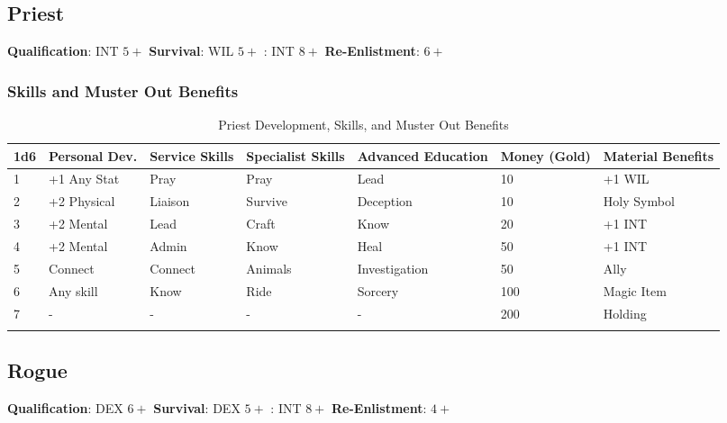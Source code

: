 \documentclass[itdr/core]{subfiles}
\begin{document}
\subsection{Priest}
\textbf{Qualification}: INT $5+$
\textbf{Survival}: WIL $5+$
: INT $8+$
\textbf{Re-Enlistment}: $6+$
\subsubsection{Skills and Muster Out Benefits}
\begin{longtable}{p{} p{} p{} p{} p{} p{} p{}}
\hline
\textbf{1d6} & \textbf{Personal Dev.} & \textbf{Service Skills} & \textbf{Specialist Skills} & \textbf{Advanced Education} & \textbf{Money (Gold)} & \textbf{Material Benefits} \\
\hline
1 & +1 Any Stat & Pray & Pray & Lead & 10 & +1 WIL \\
2 & +2 Physical & Liaison & Survive & Deception & 10 & Holy Symbol \\
3 & +2 Mental & Lead & Craft & Know & 20 & +1 INT \\
4 & +2 Mental & Admin & Know & Heal & 50 & +1 INT \\
5 & Connect & Connect & Animals & Investigation & 50 & Ally \\
6 & Any skill & Know & Ride & Sorcery & 100 & Magic Item \\
7 & - & - & - & - & 200 & Holding \\
\hline
\caption{Priest Development, Skills, and Muster Out Benefits}
\end{longtable}

\subsection{Rogue}
\textbf{Qualification}: DEX $6+$
\textbf{Survival}: DEX $5+$
: INT $8+$
\textbf{Re-Enlistment}: $4+$
\end{document}
